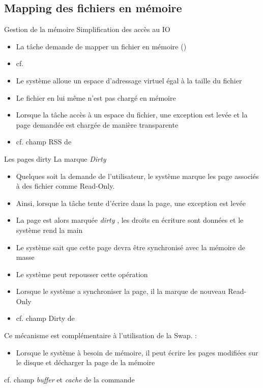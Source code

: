 \subsection{Mapping des fichiers en mémoire}

\begin{frame}{Gestion de la mémoire}
  Simplification des accès au IO
  \begin{itemize}
  \item   La  tâche   demande  de   mapper  un   fichier   en  mémoire
    ()
  \item cf. 
  \item  Le système  alloue un  espace d'adressage  virtuel égal  à la
    taille du fichier
  \item Le fichier en lui même n'est pas chargé en mémoire
  \item Lorsque la  tâche accès à un espace  du fichier, une exception
    est levée et la page demandée est chargée de manière transparente
  \item cf. champ RSS de 
  \end{itemize}
\end{frame}

\begin{frame}[fragile=singleslide]{Les pages dirty}
  La marque \emph{Dirty}
  \begin{itemize}
  \item Quelques  soit la demande de l'utilisateur,  le système marque
    les page associés à des fichier comme Read-Only.
  \item  Ainsi, lorsque  la tâche  tente  d'écrire dans  la page,  une
    exception est levée
  \item  La  page est  alors  marquée  \emph{dirty}  , les  droits  en
    écriture sont données et le système rend la main
  \item Le système sait que  cette page devra être synchronisé avec la
    mémoire de masse
  \item Le système peut repousser cette opération
  \item Lorsque  le système  a synchroniser la  page, il la  marque de
    nouveau Read-Only
  \item cf. champ Dirty de 
  \end{itemize}
  Ce mécanisme est complémentaire à l'utilisation de la Swap. :
  \begin{itemize}
  \item Lorsque  le système  à besoin de  mémoire, il peut  écrire les
    pages modifiées sur le disque et décharger la page de la mémoire
  \end{itemize}
  cf.    champ   \emph{buffer}   et   \emph{cache}  de   la   commande
\end{frame}

